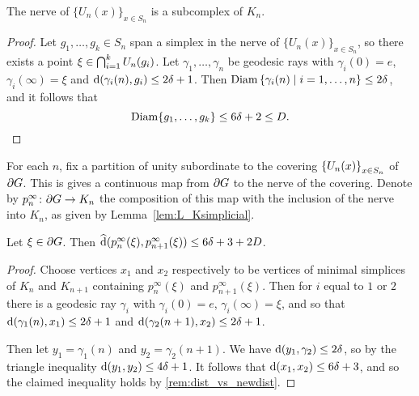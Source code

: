 \documentclass[a4paper]{article}
\begin{document}
\begin{lemma}\label{lem:L_Ksimplicial}
  The nerve of $\{U_n(x)\}_{x \in S_n}$ is a subcomplex of $K_n$.
\end{lemma}

\begin{proof}
  Let $g_1, \dotsc, g_k \in S_n$ span a simplex in the nerve of
  $\{U_n(x)\}_{x \in S_n}$, so there exists a point $\xi \in
  \bigcap_{i=1}^k U_n(g_i)$.  Let $\gamma_1, \dotsc, \gamma_n$ be
  geodesic rays with $\gamma_i(0) = e$, $\gamma_i(\infty) = \xi$ and
  $\operatorname{d}(\gamma_i(n), g_i) \leq 2\delta+1$.  Then $\operatorname{Diam}\left\{\gamma_i(n)
  \mid i=1, \dotsc, n\right\} \leq 2\delta$, and it follows that
  \begin{equation*}
    \operatorname{Diam}\{g_1, \dotsc, g_k\} \leq 6\delta+ 2 \leq D.\qedhere
  \end{equation*}
\end{proof}

\begin{definition}
  For each $n$, fix a partition of unity subordinate to the covering
  $\left\{U_n(x)\right\}_{x \in S_n}$ of $\partial G$. This is gives a
  continuous map from $\partial G$ to the nerve of the covering. Denote by
  $p^\infty_n\colon \partial G \to K_n$ the composition of this map with the
  inclusion of the nerve into $K_n$, as given by Lemma~\ref{lem:L_Ksimplicial}.
\end{definition}

\begin{lemma}\label{lem:close_projections}
  Let $\xi \in \partial G$. Then $\operatorname{\widehat{d}}(p^\infty_n(\xi),
  p^\infty_{n+1}(\xi)) \leq 6\delta+3 + 2D$.
\end{lemma}

\begin{proof}
  Choose vertices $x_1$ and $x_2$ respectively to be vertices of minimal
  simplices of $K_n$ and $K_{n+1}$ containing $p^\infty_n(\xi)$ and
  $p^\infty_{n+1}(\xi)$. Then for $i$ equal to $1$ or $2$ there is a geodesic
  ray $\gamma_i$ with $\gamma_i(0) = e$, $\gamma_i(\infty) = \xi$, and so that
  $\operatorname{d}(\gamma_1(n), x_1) \leq 2\delta+1$ and $\operatorname{d}(\gamma_2(n+1),
  x_2) \leq 2\delta+1$.

  Then let $y_1 = \gamma_1(n)$ and $y_2 = \gamma_2(n+1)$. We have
  $\operatorname{d}(y_1, \gamma_2) \leq 2\delta$, so by the triangle inequality
  $\operatorname{d}(y_1, y_2) \leq 4\delta +1$. It follows that $\operatorname{d}(x_1, x_2)
  \leq 6\delta+3$, and so the claimed inequality holds by
  \cref{rem:dist_vs_newdist}.
\end{proof}
\end{document}
